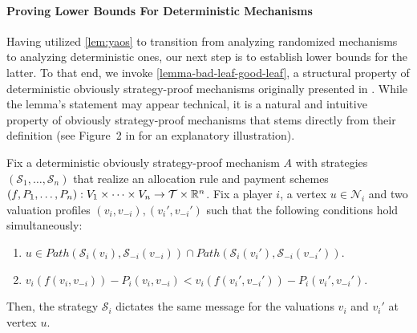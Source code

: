\paragraph{Proving Lower Bounds For Deterministic Mechanisms} 
Having utilized \cref{lem:yaos} to transition from analyzing randomized mechanisms to analyzing deterministic ones, our next step is to establish lower bounds for the latter. To that end, we invoke \cref{lemma-bad-leaf-good-leaf}, a structural property of deterministic obviously strategy-proof mechanisms originally presented in \cite{Ron24}. While the lemma’s statement may appear technical, it is a natural and intuitive property of obviously strategy-proof mechanisms that stems directly from their definition (see Figure~2 in \cite{Ron24} for an explanatory illustration).  



\begin{lemma}
\label{lemma-bad-leaf-good-leaf}
Fix a deterministic obviously strategy-proof mechanism $A$ with strategies $(\mathcal S_1,\ldots, \mathcal S_n)$
that realize an allocation rule and payment schemes $(f,P_1,\ldots,P_n):V_1\times\cdots \times V_n\to \mathcal{T} \times \mathbb R^n$.
Fix a player $i$, a vertex $u\in \mathcal N_i$
and
two valuation profiles $(v_i,v_{-i}),(v_i',v_{-i}')$ such that the following conditions hold simultaneously:
\begin{enumerate}
    \item $u\in Path(\mathcal S_i(v_i),\mathcal S_{-i}(v_{-i}))\cap Path(\mathcal S_i(v_i'), \mathcal S_{-i}(v_{-i}'))$. 
    \item $v_i(f(v_i,v_{-i}))-P_i(v_i,v_{-i})< 
v_i(f(v_i',v_{-i}'))-P_i(v_i',v_{-i}')$.
\end{enumerate}
Then,  the strategy  $\mathcal S_i$ dictates the same message for the valuations  $v_i$ and $v_i'$ at vertex $u$.   
\end{lemma}




